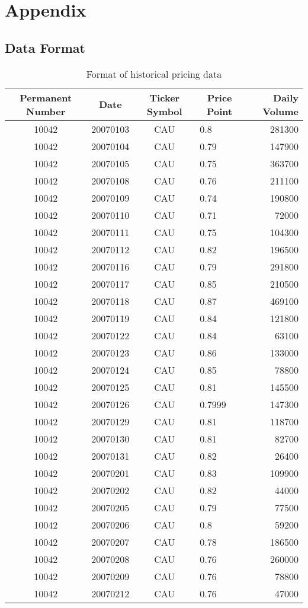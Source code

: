 \chapter{Appendix}

\section{Data Format}\label{selectedsecurities}
\begin{table}[p]
\centering
\begin{tabular}{@{}clclr@{}}
\toprule\toprule
Permanent Number & \multicolumn{1}{c}{Date} & Ticker Symbol & \multicolumn{1}{c}{Price Point} & Daily Volume \\\midrule
10042 & 20070103 & CAU & 0.8    & 281300 \\ 
10042 & 20070104 & CAU & 0.79   & 147900 \\
10042 & 20070105 & CAU & 0.75   & 363700 \\
10042 & 20070108 & CAU & 0.76   & 211100 \\
10042 & 20070109 & CAU & 0.74   & 190800 \\
10042 & 20070110 & CAU & 0.71   & 72000  \\
10042 & 20070111 & CAU & 0.75   & 104300 \\
10042 & 20070112 & CAU & 0.82   & 196500 \\
10042 & 20070116 & CAU & 0.79   & 291800 \\
10042 & 20070117 & CAU & 0.85   & 210500 \\
10042 & 20070118 & CAU & 0.87   & 469100 \\
10042 & 20070119 & CAU & 0.84   & 121800 \\
10042 & 20070122 & CAU & 0.84   & 63100  \\
10042 & 20070123 & CAU & 0.86   & 133000 \\
10042 & 20070124 & CAU & 0.85   & 78800  \\
10042 & 20070125 & CAU & 0.81   & 145500 \\
10042 & 20070126 & CAU & 0.7999 & 147300 \\
10042 & 20070129 & CAU & 0.81   & 118700 \\
10042 & 20070130 & CAU & 0.81   & 82700  \\
10042 & 20070131 & CAU & 0.82   & 26400  \\
10042 & 20070201 & CAU & 0.83   & 109900 \\
10042 & 20070202 & CAU & 0.82   & 44000  \\
10042 & 20070205 & CAU & 0.79   & 77500  \\
10042 & 20070206 & CAU & 0.8    & 59200  \\
10042 & 20070207 & CAU & 0.78   & 186500 \\
10042 & 20070208 & CAU & 0.76   & 260000 \\
10042 & 20070209 & CAU & 0.76   & 78800  \\
10042 & 20070212 & CAU & 0.76   & 47000  \\ \bottomrule
\end{tabular}
\caption{Format of historical pricing data}
\label{tab:histPrice}
\end{table}

